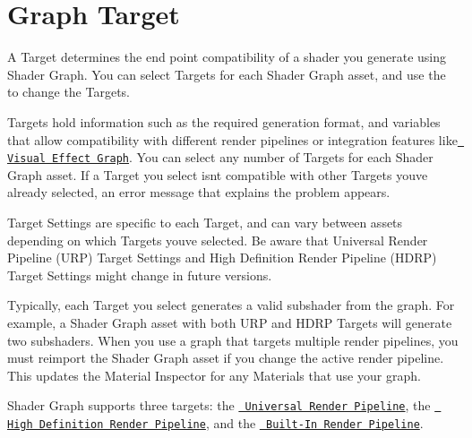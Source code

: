 \chapter{Graph Target}
\hypertarget{md__hey_tea_9_2_library_2_package_cache_2com_8unity_8shadergraph_0d14_80_88_2_documentation_0i_2_graph-_target}{}\label{md__hey_tea_9_2_library_2_package_cache_2com_8unity_8shadergraph_0d14_80_88_2_documentation_0i_2_graph-_target}
\label{md__hey_tea_9_2_library_2_package_cache_2com_8unity_8shadergraph_0d14_80_88_2_documentation_0i_2_graph-_target_autotoc_md3303}%
%
 A Target determines the end point compatibility of a shader you generate using Shader Graph. You can select Targets for each Shader Graph asset, and use the  to change the Targets.



Targets hold information such as the required generation format, and variables that allow compatibility with different render pipelines or integration features like \href{https://docs.unity3d.com/Packages/com.unity.visualeffectgraph@latest}{\texttt{ Visual Effect Graph}}. You can select any number of Targets for each Shader Graph asset. If a Target you select isn\textquotesingle{}t compatible with other Targets you\textquotesingle{}ve already selected, an error message that explains the problem appears.

Target Settings are specific to each Target, and can vary between assets depending on which Targets you\textquotesingle{}ve selected. Be aware that Universal Render Pipeline (URP) Target Settings and High Definition Render Pipeline (HDRP) Target Settings might change in future versions.

Typically, each Target you select generates a valid subshader from the graph. For example, a Shader Graph asset with both URP and HDRP Targets will generate two subshaders. When you use a graph that targets multiple render pipelines, you must reimport the Shader Graph asset if you change the active render pipeline. This updates the Material Inspector for any Materials that use your graph.

Shader Graph supports three targets\+: the \href{https://docs.unity3d.com/Packages/com.unity.render-pipelines.universal@12.0/manual/index.html}{\texttt{ Universal Render Pipeline}}, the \href{https://docs.unity3d.com/Packages/com.unity.render-pipelines.high-definition@12.0/manual/index.html}{\texttt{ High Definition Render Pipeline}}, and the \href{https://docs.unity3d.com/2020.3/Documentation/Manual/render-pipelines.html}{\texttt{ Built-\/\+In Render Pipeline}}.

